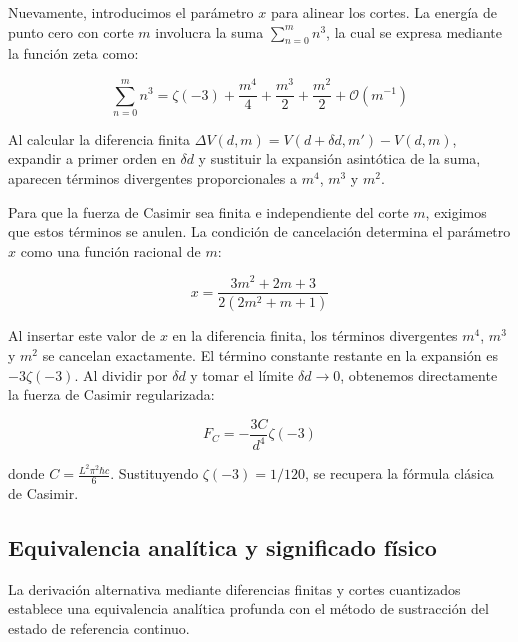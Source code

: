 Nuevamente, introducimos el parámetro $x$ para alinear los cortes. La energía de punto cero con corte $m$ involucra la suma $\sum_{n=0}^m n^3$, la cual se expresa mediante la función zeta como:

$$ \sum_{n=0}^m n^3 = \zeta(-3) + \frac{m^4}{4} + \frac{m^3}{2} + \frac{m^2}{2} + \mathcal{O}(m^{-1}) $$

Al calcular la diferencia finita $\Delta V(d, m) = V(d + \delta d, m') - V(d, m)$, expandir a primer orden en $\delta d$ y sustituir la expansión asintótica de la suma, aparecen términos divergentes proporcionales a $m^4$, $m^3$ y $m^2$. 

Para que la fuerza de Casimir sea finita e independiente del corte $m$, exigimos que estos términos se anulen. La condición de cancelación determina el parámetro $x$ como una función racional de $m$:

$$ x = \frac{3m^2 + 2m + 3}{2(2m^2 + m + 1)} $$

Al insertar este valor de $x$ en la diferencia finita, los términos divergentes $m^4$, $m^3$ y $m^2$ se cancelan exactamente. El término constante restante en la expansión es $-3\zeta(-3)$. Al dividir por $\delta d$ y tomar el límite $\delta d \to 0$, obtenemos directamente la fuerza de Casimir regularizada:

$$ F_C = - \frac{3C}{d^4} \zeta(-3) $$

donde $C = \frac{L^2 \pi^2 \hbar c}{6}$. Sustituyendo $\zeta(-3) = 1/120$, se recupera la fórmula clásica de Casimir.

\subsection{Equivalencia analítica y significado físico}

La derivación alternativa mediante diferencias finitas y cortes cuantizados establece una equivalencia analítica profunda con el método de sustracción del estado de referencia continuo. 

